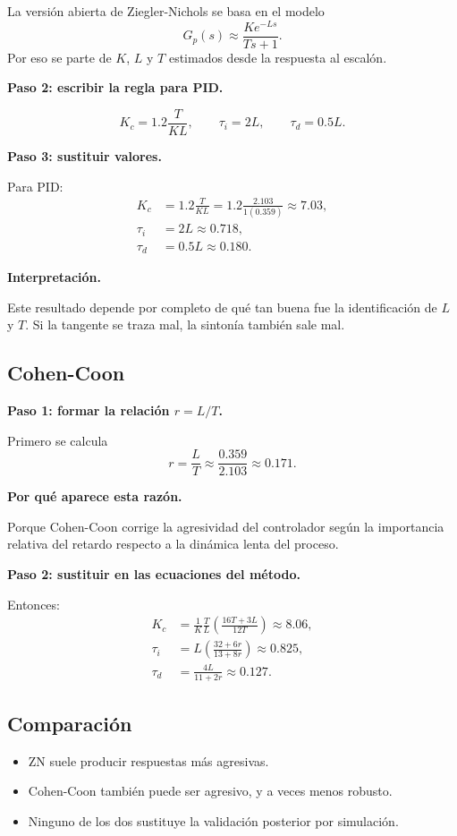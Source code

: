 \documentclass[11pt]{article}
\begin{document}
La versi\'on abierta de Ziegler-Nichols se basa en el modelo
\[
G_p(s)\approx \frac{Ke^{-Ls}}{Ts+1}.
\]
Por eso se parte de $K$, $L$ y $T$ estimados desde la respuesta al escal\'on.

\textbf{Paso 2: escribir la regla para PID.}

\[
K_c=1.2\frac{T}{KL},\qquad \tau_i=2L,\qquad \tau_d=0.5L.
\]

\textbf{Paso 3: sustituir valores.}

Para PID:
\begin{align}
K_c &= 1.2\frac{T}{KL}=1.2\frac{2.103}{1(0.359)}\approx 7.03,\\
\tau_i &= 2L\approx 0.718,\\
\tau_d &= 0.5L\approx 0.180.
\end{align}

\textbf{Interpretaci\'on.}

Este resultado depende por completo de qu\'e tan buena fue la identificaci\'on de $L$ y $T$. Si la tangente se traza mal, la sinton\'ia tambi\'en sale mal.

\subsection{Cohen-Coon}
\textbf{Paso 1: formar la relaci\'on $r=L/T$.}

Primero se calcula
\[
r=\frac{L}{T}\approx \frac{0.359}{2.103}\approx 0.171.
\]

\textbf{Por qu\'e aparece esta raz\'on.}

Porque Cohen-Coon corrige la agresividad del controlador seg\'un la importancia relativa del retardo respecto a la din\'amica lenta del proceso.

\textbf{Paso 2: sustituir en las ecuaciones del m\'etodo.}

Entonces:
\begin{align}
K_c &=
\frac{1}{K}\frac{T}{L}\left(\frac{16T+3L}{12T}\right)
\approx 8.06,\\
\tau_i &=L\left(\frac{32+6r}{13+8r}\right)\approx 0.825,\\
\tau_d &=\frac{4L}{11+2r}\approx 0.127.
\end{align}

\subsection{Comparaci\'on}
\begin{itemize}
\item ZN suele producir respuestas m\'as agresivas.
\item Cohen-Coon tambi\'en puede ser agresivo, y a veces menos robusto.
\item Ninguno de los dos sustituye la validaci\'on posterior por simulaci\'on.
\end{itemize}
\end{document}
